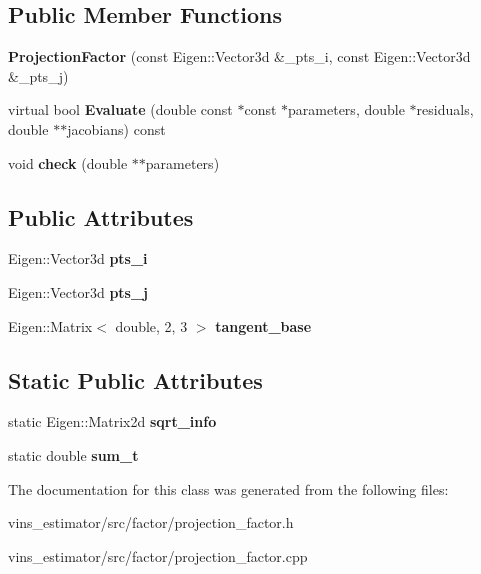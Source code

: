\subsection*{Public Member Functions}
\begin{DoxyCompactItemize}
\item 
\mbox{\label{classProjectionFactor_a4731f66e4a4181bdf9bc2038bb86703e}} 
{\bfseries Projection\+Factor} (const Eigen\+::\+Vector3d \&\+\_\+pts\+\_\+i, const Eigen\+::\+Vector3d \&\+\_\+pts\+\_\+j)
\item 
\mbox{\label{classProjectionFactor_a1217f02344d410154d049354107eebf8}} 
virtual bool {\bfseries Evaluate} (double const $\ast$const $\ast$parameters, double $\ast$residuals, double $\ast$$\ast$jacobians) const
\item 
\mbox{\label{classProjectionFactor_a1d18cd3fe4bebcb17861b99e93d32b83}} 
void {\bfseries check} (double $\ast$$\ast$parameters)
\end{DoxyCompactItemize}
\subsection*{Public Attributes}
\begin{DoxyCompactItemize}
\item 
\mbox{\label{classProjectionFactor_af9daf9298e68b8ffbc91dd4d84ba862b}} 
Eigen\+::\+Vector3d {\bfseries pts\+\_\+i}
\item 
\mbox{\label{classProjectionFactor_ad04498c0a75a9b83056e940c274b6cf0}} 
Eigen\+::\+Vector3d {\bfseries pts\+\_\+j}
\item 
\mbox{\label{classProjectionFactor_a85c10b6ee61e7398fe61194bf32c334e}} 
Eigen\+::\+Matrix$<$ double, 2, 3 $>$ {\bfseries tangent\+\_\+base}
\end{DoxyCompactItemize}
\subsection*{Static Public Attributes}
\begin{DoxyCompactItemize}
\item 
\mbox{\label{classProjectionFactor_a353dd2dbdc926b92bda598b981d8c2d2}} 
static Eigen\+::\+Matrix2d {\bfseries sqrt\+\_\+info}
\item 
\mbox{\label{classProjectionFactor_a9b20fb227c3675dc4b70d54e11cb4fd4}} 
static double {\bfseries sum\+\_\+t}
\end{DoxyCompactItemize}


The documentation for this class was generated from the following files\+:\begin{DoxyCompactItemize}
\item 
vins\+\_\+estimator/src/factor/projection\+\_\+factor.\+h\item 
vins\+\_\+estimator/src/factor/projection\+\_\+factor.\+cpp\end{DoxyCompactItemize}
